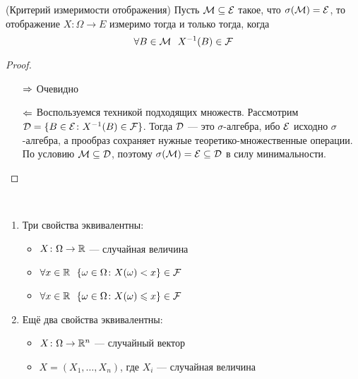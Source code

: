 \begin{lemma} (Критерий измеримости отображения)
	Пусть $\mathcal{M} \subseteq \mathcal{E}$ такое, что $\sigma(\mathcal{M}) = \mathcal{E}$, то отображение $X \colon \Omega \to E$ измеримо тогда и только тогда, когда
	\[
		\forall B \in \mathcal{M}\ \ X^{-1}(B) \in \mathcal{F}
	\]
\end{lemma}

\begin{proof}~
	\begin{itemize}
		\item[$\Rightarrow$] Очевидно
		
		\item[$\Leftarrow$] Воспользуемся техникой подходящих множеств. Рассмотрим $\mathcal{D} = \{B \in \mathcal{E} \colon X^{-1}(B) \in \mathcal{F}\}$. Тогда $\mathcal{D}$ --- это $\sigma$-алгебра, ибо $\mathcal{E}$ исходно $\sigma$-алгебра, а прообраз сохраняет нужные теоретико-множественные операции. По условию $\mathcal{M} \subseteq \mathcal{D}$, поэтому $\sigma(\mathcal{M}) = \mathcal{E} \subseteq \mathcal{D}$ в силу минимальности.
	\end{itemize}
\end{proof}

\begin{corollary}~
	\begin{enumerate}
		\item Три свойства эквивалентны:
		\begin{itemize}
			\item $X \colon \Omega \to \mathbb{R}$ --- случайная величина
			
			\item $\forall x \in \mathbb{R}\ \ \{\omega \in \Omega \colon X(\omega) < x\} \in \mathcal{F}$
			
			\item $\forall x \in \mathbb{R}\ \ \{\omega \in \Omega \colon X(\omega) \leqslant x\} \in \mathcal{F}$
		\end{itemize}
		
		\item Ещё два свойства эквивалентны:
		\begin{itemize}
			\item $X \colon \Omega \to \mathbb{R}^n$ --- случайный вектор
			
			\item $X = (X_1, \ldots, X_n)$, где $X_i$ --- случайная величина
		\end{itemize}
	\end{enumerate}
\end{corollary}

